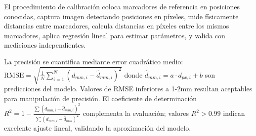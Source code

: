 El procedimiento de calibración coloca marcadores de referencia en posiciones conocidas, captura imagen detectando posiciones en píxeles, mide físicamente distancias entre marcadores, calcula distancias en píxeles entre los mismos marcadores, aplica regresión lineal para estimar parámetros, y valida con mediciones independientes.

La precisión se cuantifica mediante error cuadrático medio: $\text{RMSE} = \sqrt{\frac{1}{N}\sum_{i=1}^{N}(d_{mm,i} - \hat{d}_{mm,i})^2}$ donde $\hat{d}_{mm,i} = a \cdot d_{px,i} + b$ son predicciones del modelo. Valores de RMSE inferiores a 1-2mm resultan aceptables para manipulación de precisión. El coeficiente de determinación $R^2 = 1 - \frac{\sum (d_{mm,i} - \hat{d}_{mm,i})^2}{\sum (d_{mm,i} - \bar{d}_{mm})^2}$ complementa la evaluación; valores $R^2 > 0.99$ indican excelente ajuste lineal, validando la aproximación del modelo.
